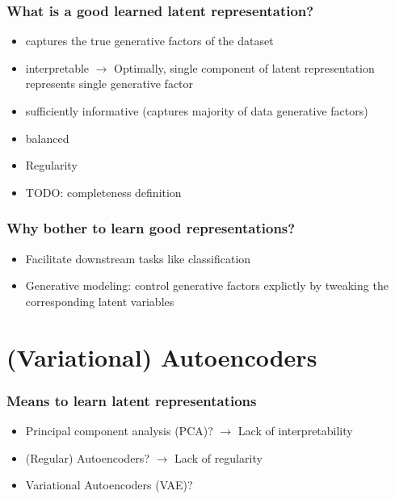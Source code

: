\documentclass{beamer}
\theoremstyle{definition}
\begin{document}
    \begin{frame}
      \frametitle{What is a good learned latent representation?}
      \begin{itemize}
        \item captures the true generative factors of the dataset
        \item interpretable
              $\rightarrow$ Optimally, single component of latent representation represents single generative factor
        \item sufficiently informative (captures majority of data generative factors)
        \item balanced
        \item Regularity
        \item TODO: completeness definition
      \end{itemize}
    \end{frame}

    \begin{frame}
        \frametitle{Why bother to learn good representations?}
        \begin{itemize}
          \item Facilitate downstream tasks like classification
          \item Generative modeling: control generative factors explictly by tweaking the corresponding latent variables
        \end{itemize}
      \end{frame}

    \section{(Variational) Autoencoders}
    \begin{frame}
      \frametitle{Means to learn latent representations}
      \begin{itemize}
        \item Principal component analysis (PCA)? $\rightarrow$ Lack of interpretability
        \item (Regular) Autoencoders? $\rightarrow$ Lack of regularity
        \item Variational Autoencoders (VAE)?
      \end{itemize}
    \end{frame}
\end{document}
